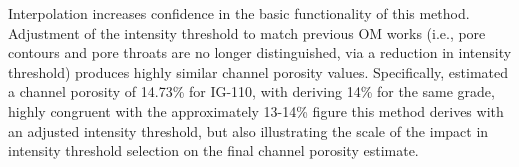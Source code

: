 \documentclass[3p,twocolumn]{elsarticle}
\begin{document}
Interpolation increases confidence in the basic functionality of this method.
Adjustment of the intensity threshold to match previous OM works (i.e., pore
contours and pore throats are no longer distinguished, via a reduction in
intensity threshold) produces highly similar channel porosity values.
Specifically, \citep{Kane2011a} estimated a channel porosity of 14.73\% for
IG-110, with \citep{Huang2019} deriving 14\% for the same grade, highly
congruent with the approximately 13-14\% figure this method derives with an
adjusted intensity threshold, but also illustrating the scale of the impact in
intensity threshold selection on the final channel porosity estimate.
\clearpage


\end{document}
